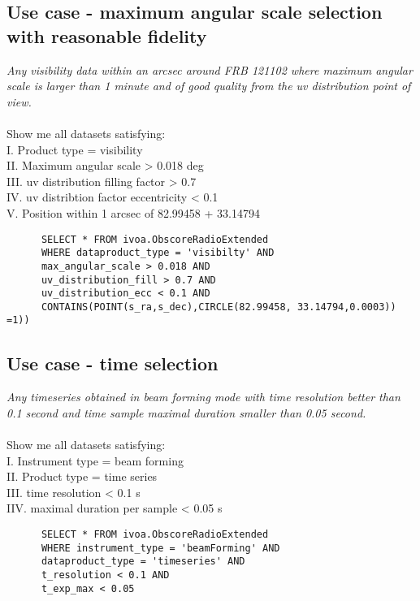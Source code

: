 \subsection{Use case - maximum angular scale selection with reasonable fidelity}
\textit{Any visibility data within an arcsec around FRB 121102 where  maximum angular scale is larger than 1 minute  and 
of good quality from the uv distribution point of view.}\\ \\
Show me all datasets satisfying:\\
I. Product type = visibility \\
II. Maximum angular scale  >  0.018 deg \\
III. uv distribution filling factor  > 0.7 \\
IV. uv distribtion factor eccentricity  < 0.1 \\
V. Position within 1 arcsec of 82.99458 + 33.14794
\begin{verbatim}
      SELECT * FROM ivoa.ObscoreRadioExtended
      WHERE dataproduct_type = 'visibilty' AND
      max_angular_scale > 0.018 AND
      uv_distribution_fill > 0.7 AND
      uv_distribution_ecc < 0.1 AND 
      CONTAINS(POINT(s_ra,s_dec),CIRCLE(82.99458, 33.14794,0.0003)) =1))
\end{verbatim}

\subsection{Use case -  time selection }
\textit{Any timeseries obtained in beam forming mode with time resolution better than 0.1 second and time sample maximal duration smaller than 0.05 second. }\\ \\
Show me all datasets satisfying:\\
I. Instrument type = beam forming\\
II. Product type = time series  \\
III. time resolution < 0.1 s\\
IIV. maximal duration per sample  < 0.05 s \\

\begin{verbatim}
      SELECT * FROM ivoa.ObscoreRadioExtended
      WHERE instrument_type = 'beamForming' AND
      dataproduct_type = 'timeseries' AND
      t_resolution < 0.1 AND
      t_exp_max < 0.05 
\end{verbatim}
